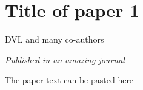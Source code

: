 \chapter{Title of paper 1}

\begin{center}
 DVL and many co-authors
\end{center}

\vfill

\textit{Published in an amazing journal}

\newpage

The paper text can be pasted here
